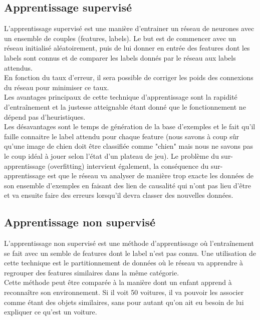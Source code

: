 \documentclass{article}
\begin{document}
\subsection{Apprentissage supervisé}

L'apprentissage supervisé est une manière d'entrainer un réseau de neurones avec un ensemble de couples (features, labels). Le but est de commencer avec un réseau initialisé aléatoirement, puis de lui donner en entrée des features dont les labels sont connus et de comparer les labels donnés par le réseau aux labels attendus.\\
En fonction du taux d'erreur, il sera possible de corriger les poids des connexions du réseau pour minimiser ce taux\cite{wikisupervised}.\\

Les avantages principaux de cette technique d'apprentissage sont la rapidité d'entraînement et la justesse atteignable étant donné que le fonctionnement ne dépend pas d'heuristiques.\\

Les désavantages sont le temps de génération de la base d'exemples et le fait qu'il faille connaitre le label attendu pour chaque feature (nous savons à coup sûr qu'une image de chien doit être classifiée comme "chien" mais nous ne savons pas le coup idéal à jouer selon l'état d'un plateau de jeu). Le problème du sur-apprentissage (overfitting) intervient également, la conséquence du sur-apprentissage est que le réseau va analyser de manière trop exacte les données de son ensemble d'exemples en faisant des lien de causalité qui n'ont pas lieu d'être et va ensuite faire des erreurs lorsqu'il devra classer des nouvelles données.

\subsection{Apprentissage non supervisé}

L'apprentissage non supervisé est une méthode d'apprentissage où l'entraînement se fait avec un semble de features dont le label n'est pas connu. Une utilisation de cette technique est le partitionnement de données où le réseau va apprendre à regrouper des features similaires dans la même catégorie\cite{wikiunsupervised}.\\

Cette méthode peut être comparée à la manière dont un enfant apprend à reconnaître son environnement. Si il voit 50 voitures, il va pouvoir les associer comme étant des objets similaires, sans pour autant qu'on ait eu besoin de lui expliquer ce qu'est un voiture.
\end{document}
